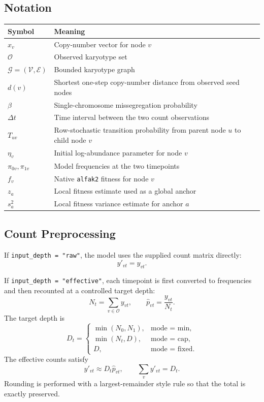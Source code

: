\documentclass[11pt]{article}
\begin{document}
\subsection{Notation}

\begin{table}[h]
\centering
\begin{tabular}{ll}
\toprule
Symbol & Meaning \\
\midrule
$x_v$ & Copy-number vector for node $v$ \\
$\mathcal{O}$ & Observed karyotype set \\
$\mathcal{G}=(\mathcal{V},\mathcal{E})$ & Bounded karyotype graph \\
$d(v)$ & Shortest one-step copy-number distance from observed seed nodes \\
$\beta$ & Single-chromosome missegregation probability \\
$\Delta t$ & Time interval between the two count observations \\
$T_{uv}$ & Row-stochastic transition probability from parent node $u$ to child node $v$ \\
$\eta_v$ & Initial log-abundance parameter for node $v$ \\
$\pi_{0v}, \pi_{1v}$ & Model frequencies at the two timepoints \\
$f_v$ & Native \texttt{alfak2} fitness for node $v$ \\
$z_a$ & Local fitness estimate used as a global anchor \\
$s_a^2$ & Local fitness variance estimate for anchor $a$ \\
\bottomrule
\end{tabular}
\end{table}

\subsection{Count Preprocessing}
\label{sec:s-preprocessing}

If \texttt{input\_depth = "raw"}, the model uses the supplied count matrix
directly:
\[
  y'_{vt}=y_{vt}.
\]

If \texttt{input\_depth = "effective"}, each timepoint is first converted to
frequencies and then recounted at a controlled target depth:
\[
  N_t = \sum_{v \in \mathcal{O}} y_{vt},
  \qquad
  \hat p_{vt} = \frac{y_{vt}}{N_t}.
\]
The target depth is
\[
  D_t =
  \begin{cases}
  \min(N_0,N_1), & \text{mode = min},\\
  \min(N_t,D), & \text{mode = cap},\\
  D, & \text{mode = fixed}.
  \end{cases}
\]
The effective counts satisfy
\[
  y'_{vt} \approx D_t \hat p_{vt},
  \qquad
  \sum_v y'_{vt}=D_t.
\]
Rounding is performed with a largest-remainder style rule so that the total is
exactly preserved.
\end{document}
